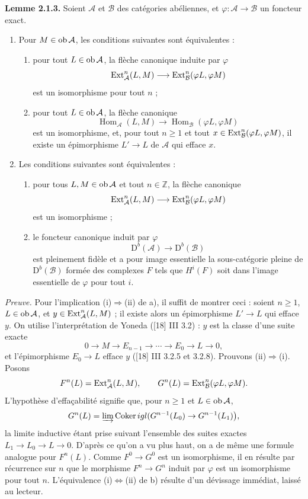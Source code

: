 \documentclass[11pt]{article}
\begin{document}
\textbf{Lemme 2.1.3.} Soient $\mathcal A$ et $\mathcal B$ des catégories abéliennes, et $\varphi:\mathcal A\to\mathcal B$ un foncteur exact.
\begin{enumerate}[label=\alph*)]
\item Pour $M\in\operatorname{ob}\mathcal A$, les conditions suivantes sont équivalentes :
\begin{enumerate}[label=(\roman*)]
\item pour tout $L\in\operatorname{ob}\mathcal A$, la flèche canonique induite par $\varphi$
\[
\operatorname{Ext}^n_{\mathcal A}(L,M)\longrightarrow\operatorname{Ext}^n_{\mathcal B}(\varphi L,\varphi M)
\]
est un isomorphisme pour tout $n$ ;
\item pour tout $L\in\operatorname{ob}\mathcal A$, la flèche canonique
\[
\operatorname{Hom}_{\mathcal A}(L,M)\longrightarrow\operatorname{Hom}_{\mathcal B}(\varphi L,\varphi M)
\]
est un isomorphisme, et, pour tout $n\ge1$ et tout $x\in\operatorname{Ext}^n_{\mathcal B}(\varphi L,\varphi M)$, il existe un épimorphisme $L'\to L$ de $\mathcal A$ qui efface $x$.
\end{enumerate}
\item Les conditions suivantes sont équivalentes :
\begin{enumerate}[label=(\roman*)]
\item pour tous $L,M\in\operatorname{ob}\mathcal A$ et tout $n\in\mathbb Z$, la flèche canonique
\[
\operatorname{Ext}^n_{\mathcal A}(L,M)\longrightarrow\operatorname{Ext}^n_{\mathcal B}(\varphi L,\varphi M)
\]
est un isomorphisme ;
\item le foncteur canonique induit par $\varphi$
\[
\mathrm D^b(\mathcal A)\longrightarrow\mathrm D^b(\mathcal B)
\]
est pleinement fidèle et a pour image essentielle la sous-catégorie pleine de $\mathrm D^b(\mathcal B)$ formée des complexes $F$ tels que $H^i(F)$ soit dans l'image essentielle de $\varphi$ pour tout $i$.
\end{enumerate}
\end{enumerate}

\emph{Preuve.} Pour l'implication (i)$\Rightarrow$(ii) de a), il suffit de montrer ceci : soient $n\ge1$, $L\in\operatorname{ob}\mathcal A$, et $y\in\operatorname{Ext}^n_{\mathcal A}(L,M)$ ; il existe alors un épimorphisme $L'\to L$ qui efface $y$. On utilise l'interprétation de Yoneda ([18] III 3.2) : $y$ est la classe d'une suite exacte
\[
0\longrightarrow M\longrightarrow E_{n-1}\longrightarrow\cdots\longrightarrow E_0\longrightarrow L\longrightarrow0,
\]
et l'épimorphisme $E_0\to L$ efface $y$ ([18] III 3.2.5 et 3.2.8). Prouvons (ii)$\Rightarrow$(i). Posons
\[
F^n(L)=\operatorname{Ext}^n_{\mathcal A}(L,M),\qquad
G^n(L)=\operatorname{Ext}^n_{\mathcal B}(\varphi L,\varphi M).
\]
L'hypothèse d'effaçabilité signifie que, pour $n\ge1$ et $L\in\operatorname{ob}\mathcal A$,
\[
G^n(L)=\varinjlim\operatorname{Coker}igl(G^{n-1}(L_0)\to G^{n-1}(L_1)\bigr),
\]
la limite inductive étant prise suivant l'ensemble des suites exactes $L_1\to L_0\to L\to0$. D'après ce qu'on a vu plus haut, on a de même une formule analogue pour $F^n(L)$. Comme $F^0\to G^0$ est un isomorphisme, il en résulte par récurrence sur $n$ que le morphisme $F^n\to G^n$ induit par $\varphi$ est un isomorphisme pour tout $n$. L'équivalence (i)$\Leftrightarrow$(ii) de b) résulte d'un dévissage immédiat, laissé au lecteur.
\end{document}
